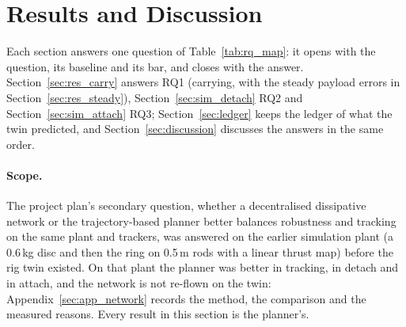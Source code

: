\section{Results and Discussion}
\label{sec:results}



Each section answers one question of Table~\ref{tab:rq_map}: it opens with the question, its baseline
and its bar, and closes with the answer. Section~\ref{sec:res_carry} answers RQ1 (carrying, with the steady
payload errors in Section~\ref{sec:res_steady}), Section~\ref{sec:sim_detach} RQ2 and
Section~\ref{sec:sim_attach} RQ3; Section~\ref{sec:ledger} keeps the ledger of what the twin predicted, and
Section~\ref{sec:discussion} discusses the answers in the same order.

\paragraph{Scope.} The project plan's secondary question, whether a decentralised dissipative network or the
trajectory-based planner better balances robustness and tracking on the same plant and trackers, was
answered on the earlier simulation plant (a 0.6\,kg disc and then the ring on 0.5\,m rods with a linear
thrust map) before the rig twin existed. On that plant the planner was better in tracking, in detach and in
attach, and the network is not re-flown on the twin: Appendix~\ref{sec:app_network} records the method, the
comparison and the measured reasons. Every result in this section is the planner's.











